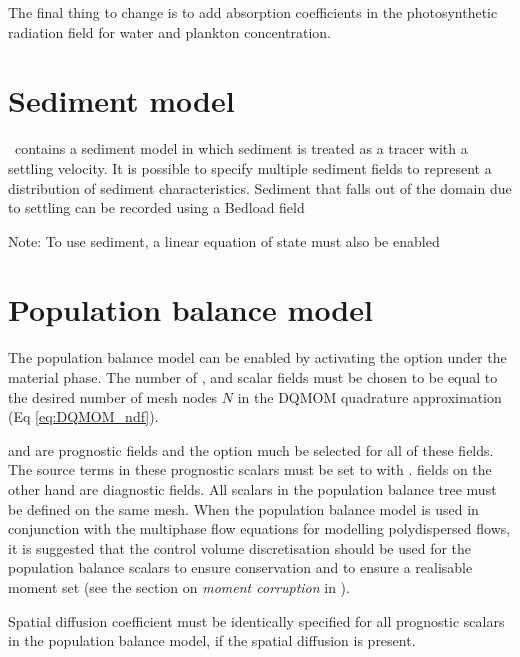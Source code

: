 The final thing to change is to add absorption coefficients in the photosynthetic radiation field for water and plankton concentration.

\section{Sediment model}
\label{config:sediments}

\fluidity\ contains a sediment model in which sediment is treated as a
tracer with a settling velocity. 
It is possible to specify multiple sediment fields to represent a distribution of sediment
characteristics.
Sediment that falls out of the domain due to settling can be recorded using a
Bedload field

Note: To use sediment, a linear equation of state must also be enabled

\section{Population balance model}
\label{config:pbe}

The population balance model can be enabled by activating the  option under the material phase.
The number of ,  and  scalar fields must be chosen to be equal to the desired number of mesh nodes $N$ in the DQMOM quadrature approximation (Eq \eqref{eq:DQMOM_ndf}). 

 and  are prognostic fields and the  option much be selected for all of these fields. The source terms in these prognostic scalars must be set to  with .  fields on the other hand are diagnostic fields. All scalars in the population balance tree must be defined on the same mesh. When the population balance model is used in conjunction with the multiphase flow equations for modelling polydispersed flows, it is suggested that the control volume discretisation should be used for the population balance scalars to ensure conservation and to ensure a realisable moment set (see the section on \emph{moment corruption} in \citet{bhutani2016}). 

Spatial diffusion coefficient must be identically specified for all prognostic scalars in the population balance model, if the spatial diffusion is present. 

